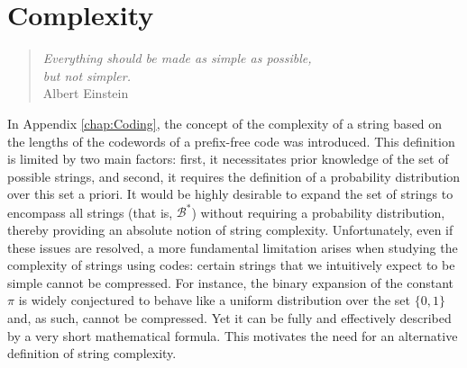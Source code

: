 %
%




\chapter{Complexity}
\label{chap:Algorithmic_Information}

\begin{quote}
\begin{flushright}
\emph{Everything should be made as simple as possible, \\
but not simpler. \\}
Albert Einstein
\end{flushright}
\end{quote}
\bigskip

In Appendix \ref{chap:Coding}, the concept of the complexity of a string based on the lengths of the codewords of a prefix-free code was introduced. This definition is limited by two main factors: first, it necessitates prior knowledge of the set of possible strings, and second, it requires the definition of a probability distribution over this set a priori. It would be highly desirable to expand the set of strings to encompass all strings (that is, $\mathcal{B}^\ast$) without requiring a probability distribution, thereby providing an absolute notion of string complexity. Unfortunately, even if these issues are resolved, a more fundamental limitation arises when studying the complexity of strings using codes: certain strings that we intuitively expect to be simple cannot be compressed. For instance, the binary expansion of the constant $\pi$ is widely conjectured to behave like a uniform distribution over the set $\{0, 1\}$ and, as such, cannot be compressed. Yet it can be fully and effectively described by a very short mathematical formula. This motivates the need for an alternative definition of string complexity.


